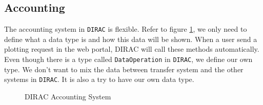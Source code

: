 \subsection{Accounting}

The accounting system 
in {\tt DIRAC} is flexible. Refer to figure \ref{fig:acct},
we only need to define 
what a data type is and how this data will be shown.
When a user send a plotting request in the web portal, 
DIRAC will call these methods automatically.
Even though there is a type called {\tt DataOperation} in {\tt DIRAC},
we define our own type. We don't want to mix the data between 
transfer system and the other systems in {\tt DIRAC}.
It is also a try to have our own data type.
\begin{figure}[htbp]
    
    \caption{\label{fig:acct}DIRAC Accounting System}
\end{figure}
